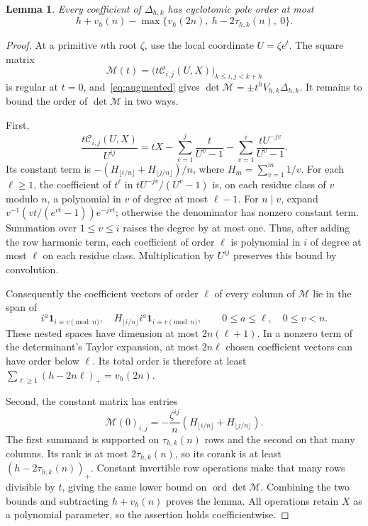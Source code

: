 \documentclass[12pt]{article}
\newtheorem{lemma}[theorem]{Lemma}
\theoremstyle{remark}
\DeclareMathOperator{\ord}{ord}
\begin{document}
\begin{lemma}\label{lem:cyclotomic}
Every coefficient of $\Delta_{h,k}$ has cyclotomic pole order at most
\begin{equation}\label{eq:cyclobound}
h+v_h(n)-\max\{v_h(2n),\ h-2\tau_{h,k}(n),\ 0\}.
\end{equation}
\end{lemma}
\begin{proof}
At a primitive $n$th root $\zeta$, use the local coordinate $U=\zeta e^t$.
The square matrix
\[
\mathcal M(t)=\bigl(t\mathcal C_{i,j}(U,X)\bigr)_{k\leq i,j<k+h}
\]
is regular at $t=0$, and~\eqref{eq:augmented} gives
$\det\mathcal M=\pm t^hV_{h,k}\Delta_{h,k}$.
It remains to bound the order of $\det\mathcal M$ in two ways.

First,
\[
\frac{t\mathcal C_{i,j}(U,X)}{U^{ij}}
=tX-\sum_{v=1}^{j}\frac{t}{U^v-1}
-\sum_{v=1}^{i}\frac{tU^{-jv}}{U^v-1}.
\]
Its constant term is $-(H_{\lfloor i/n\rfloor}+H_{\lfloor j/n\rfloor})/n$,
where $H_m=\sum_{v=1}^m1/v$.
For each $\ell\geq1$, the coefficient of $t^\ell$ in
$tU^{-jv}/(U^v-1)$ is, on each residue class of $v$ modulo $n$, a polynomial
in $v$ of degree at most $\ell-1$. For $n\mid v$, expand
$v^{-1}(vt/(e^{vt}-1))e^{-jvt}$; otherwise the denominator has nonzero
constant term. Summation over $1\leq v\leq i$ raises the degree by at most one.
Thus, after adding the row harmonic term, each coefficient of order $\ell$
is polynomial in $i$ of degree at most $\ell$ on each residue class.
Multiplication by $U^{ij}$ preserves this bound by convolution.

Consequently the coefficient vectors of order $\ell$ of every column of $\mathcal M$
lie in the span of
\[
i^a\mathbf1_{i\equiv v\pmod n},\quad
H_{\lfloor i/n\rfloor}i^a\mathbf1_{i\equiv v\pmod n},
\qquad 0\leq a\leq\ell,\quad0\leq v<n.
\]
These nested spaces have dimension at most $2n(\ell+1)$.
In a nonzero term of the determinant's Taylor expansion, at most $2n\ell$
chosen coefficient vectors can have order below $\ell$.
Its total order is therefore at least
$\sum_{\ell\geq1}(h-2n\ell)_+=v_h(2n)$.

Second, the constant matrix has entries
\[
\mathcal M(0)_{i,j}=-\frac{\zeta^{ij}}n
\left(H_{\lfloor i/n\rfloor}+H_{\lfloor j/n\rfloor}\right).
\]
The first summand is supported on $\tau_{h,k}(n)$ rows and the second on
that many columns. Its rank is at most $2\tau_{h,k}(n)$, so its corank is
at least $(h-2\tau_{h,k}(n))_+$. Constant invertible row operations make
that many rows divisible by $t$, giving the same lower bound on $\ord\det\mathcal M$.
Combining the two bounds and subtracting $h+v_h(n)$ proves the lemma.
All operations retain $X$ as a polynomial parameter, so the assertion holds
coefficientwise.
\end{proof}
\end{document}
